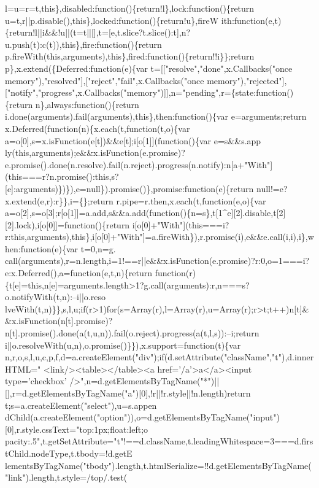 \begin{DoxyCode}
{       l=u=r=t,this\},disabled:function()\{return!l\},lock:function()\{return
       u=t,r||p.disable(),this\},locked:function()\{return!u\},fireW
      ith:function(e,t)\{return!l||i&&!u||(t=t||[],t=[e,t.slice?t.slice():t],n?u.push(t):c(t)),this\},fire:function()\{return p.fireWith(this,arguments),this\},fired:function()\{return!!i\}\};return
       p\},x.extend(\{Deferred:function(e)\{var t=[["resolve","done",x.Callbacks("once memory"),"resolved"],["reject","fail",x.Callbacks("once
       memory"),"rejected"],["notify","progress",x.Callbacks("memory")]],n="pending",r=\{state:function()\{return
       n\},always:function()\{return i.done(arguments).fail(arguments),this\},then:function()\{var e=arguments;return
       x.Deferred(function(n)\{x.each(t,function(t,o)\{var a=o[0],s=x.isFunction(e[t])&&e[t];i[o[1]](function()\{var
       e=s&&s.app
      ly(this,arguments);e&&x.isFunction(e.promise)?e.promise().done(n.resolve).fail(n.reject).progress(n.notify):n[a+"With"](this===r?n.promise():this,s?[e]:arguments)\})\}),e=null\}).promise()\},promise:function(e)\{return
       null!=e?x.extend(e,r):r\}\},i=\{\};return r.pipe=r.then,x.each(t,function(e,o)\{var
       a=o[2],s=o[3];r[o[1]]=a.add,s&&a.add(function()\{n=s\},t[1^e][2].disable,t[2][2].lock),i[o[0]]=function()\{return
       i[o[0]+"With"](this===i?r:this,arguments),this\},i[o[0]+"With"]=a.fireWith\}),r.promise(i),e&&e.call(i,i),i\},when:function(e)\{var
       t=0,n=g.
      call(arguments),r=n.length,i=1!==r||e&&x.isFunction(e.promise)?r:0,o=1===i?e:x.Deferred(),a=function(e,t,n)\{return
       function(r)\{t[e]=this,n[e]=arguments.length>1?g.call(arguments):r,n===s?o.notifyWith(t,n):--i||o.reso
      lveWith(t,n)\}\},s,l,u;if(r>1)for(s=Array(r),l=Array(r),u=Array(r);r>t;t++)n[t]&&x.isFunction(n[t].promise)?n[t].promise().done(a(t,u,n)).fail(o.reject).progress(a(t,l,s)):--i;return
       i||o.resolveWith(u,n),o.promise()\}\}),x.support=function(t)\{var
       n,r,o,s,l,u,c,p,f,d=a.createElement("div");if(d.setAttribute("className","t"),d.innerHTML="  <link/><table></table><a href='}/a\textcolor{stringliteral}{'>a</a><input type='}checkbox\textcolor{stringliteral}{'
      />",n=d.getElementsByTagName("*")||[],r=d.getElementsByTagName("a")[0],!r||!r.style||!n.length)return
       t;s=a.createElement("select"),u=s.appen
      dChild(a.createElement("option")),o=d.getElementsByTagName("input")[0],r.style.cssText="top:1px;float:left;o
      pacity:.5",t.getSetAttribute="t"!==d.className,t.leadingWhitespace=3===d.firstChild.nodeType,t.tbody=!d.getE
      lementsByTagName("tbody").length,t.htmlSerialize=!!d.getElementsByTagName("link").length,t.style=/top/.test(
}
\end{DoxyCode}
